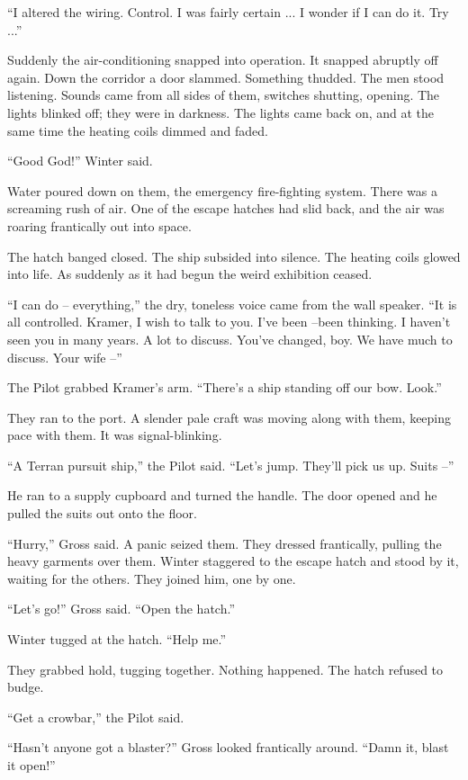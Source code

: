 \documentclass[12pt,a5paper]{book}
\newcommand{\storybreak}{%
  \par\vspace{0.6\baselineskip}
  \begin{center}\color{coveraccent}\small *\enspace *\enspace *\end{center}
  \vspace{0.3\baselineskip}\noindent\ignorespaces
}
\begin{document}
“I altered the wiring. Control. I was fairly certain ... I wonder if I can do it. Try ...”

Suddenly the air-conditioning snapped into operation. It snapped abruptly off again. Down the corridor a door slammed. Something thudded. The men stood listening. Sounds came from all sides of them, switches shutting, opening. The lights blinked off; they were in darkness. The lights came back on, and at the same time the heating coils dimmed and faded.

“Good God!” Winter said.

Water poured down on them, the emergency fire-fighting system. There was a screaming rush of air. One of the escape hatches had slid back, and the air was roaring frantically out into space.

The hatch banged closed. The ship subsided into silence. The heating coils glowed into life. As suddenly as it had begun the weird exhibition ceased.

“I can do – everything,” the dry, toneless voice came from the wall speaker. “It is all controlled. Kramer, I wish to talk to you. I've been –been thinking. I haven't seen you in many years. A lot to discuss. You've changed, boy. We have much to discuss. Your wife –”

The Pilot grabbed Kramer's arm. “There's a ship standing off our bow. Look.”

\storybreak
They ran to the port. A slender pale craft was moving along with them, keeping pace with them. It was signal-blinking.

“A Terran pursuit ship,” the Pilot said. “Let's jump. They'll pick us up. Suits –”

He ran to a supply cupboard and turned the handle. The door opened and he pulled the suits out onto the floor.

“Hurry,” Gross said. A panic seized them. They dressed frantically, pulling the heavy garments over them. Winter staggered to the escape hatch and stood by it, waiting for the others. They joined him, one by one.

“Let's go!” Gross said. “Open the hatch.”

Winter tugged at the hatch. “Help me.”

They grabbed hold, tugging together. Nothing happened. The hatch refused to budge.

“Get a crowbar,” the Pilot said.

“Hasn't anyone got a blaster?” Gross looked frantically around. “Damn it, blast it open!”
\end{document}

